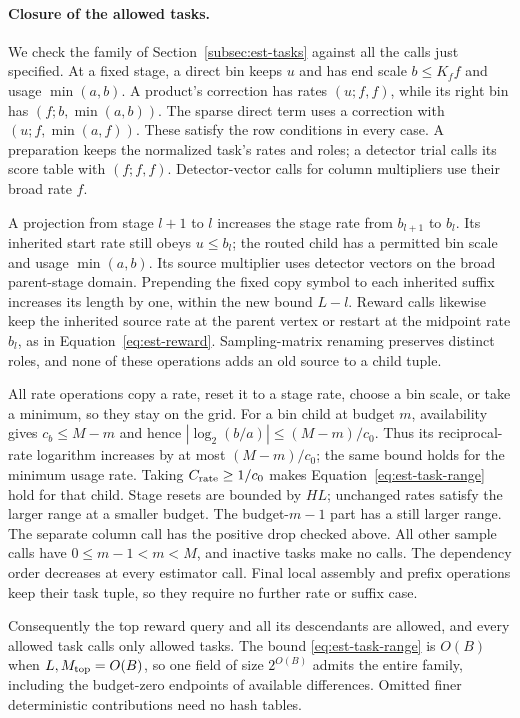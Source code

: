 \paragraph{Closure of the allowed tasks.}
We check the family of Section~\ref{subsec:est-tasks} against all the
calls just specified.  At a fixed stage, a direct bin keeps $u$ and has
end scale $b\le K_f f$ and usage $\min(a,b)$.  A product's correction
has rates $(u;f,f)$, while its right bin has
$(f;b,\min(a,b))$.  The sparse direct term uses a correction with
$(u;f,\min(a,f))$.  These satisfy the row conditions in every case.
A preparation keeps the normalized task's rates and roles; a detector
trial calls its score table with $(f;f,f)$.  Detector-vector calls for
column multipliers use their broad rate $f$.

A projection from stage $l+1$ to $l$ increases the stage rate from
$b_{l+1}$ to $b_l$.  Its inherited start rate still obeys $u\le b_l$;
the routed child has a permitted bin scale and usage $\min(a,b)$.
Its source multiplier uses detector vectors on the broad parent-stage
domain.  Prepending the fixed copy symbol to each inherited suffix
increases its length by one, within the new bound $L-l$.
Reward calls likewise keep the inherited source rate at the parent
vertex or restart at the midpoint rate $b_l$, as in
Equation~\eqref{eq:est-reward}.  Sampling-matrix renaming preserves distinct
roles, and none of these operations adds an old source to a child tuple.

All rate operations copy a rate, reset it to a stage rate, choose a bin
scale, or take a minimum, so they stay on the grid.  For a bin child at
budget $m$, availability gives
$c_b\le M-m$ and hence $|\log_2(b/a)|\le(M-m)/c_0$.
Thus its reciprocal-rate logarithm increases by at most
$(M-m)/c_0$; the same bound holds for the minimum usage rate.
Taking $C_{\rm rate}\ge1/c_0$ makes
Equation~\eqref{eq:est-task-range} hold for that child.  Stage resets
are bounded by $HL$; unchanged rates satisfy the larger range at a
smaller budget.  The budget-$m-1$ part has a still larger range.
The separate column call has the positive drop checked above.
All other sample calls have $0\le m-1<m<M$, and inactive tasks make
no calls.  The dependency order decreases at every estimator call.
Final local assembly and prefix operations keep their task tuple, so
they require no further rate or suffix case.

Consequently the top reward query and all its descendants are allowed,
and every allowed task calls only allowed tasks.  The bound
\eqref{eq:est-task-range} is $O(B)$ when $L,M_{\rm top}=O(B)$, so one
field of size $2^{O(B)}$ admits the entire family, including the
budget-zero endpoints of available differences.  Omitted finer
deterministic contributions need no hash tables.

